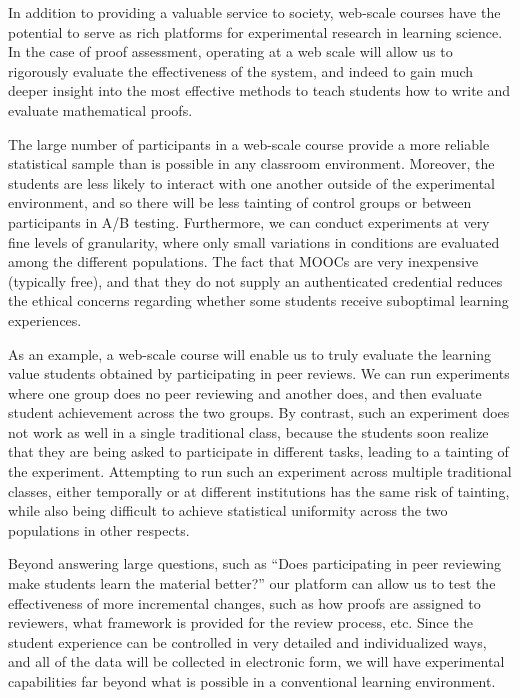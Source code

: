 \documentclass[12pt]{article}
\begin{document}
In addition to providing a valuable service to society, web-scale
courses have the potential to serve as rich platforms for experimental
research in learning science.  In the case of proof assessment,
operating at a web scale will allow us to rigorously evaluate the
effectiveness of the system, and indeed to gain much deeper insight
into the most effective methods to teach students how to write and
evaluate mathematical proofs.

The large number of participants in a web-scale course provide a more
reliable statistical sample than is possible in any classroom
environment.  Moreover, the students are less likely to interact with
one another outside of the experimental environment, and so there will
be less tainting of control groups or between participants in A/B
testing.  Furthermore, we can conduct experiments at very fine levels
of granularity, where only small variations in conditions are
evaluated among the different populations.  The fact that MOOCs are
very inexpensive (typically free), and that they do not supply an
authenticated credential reduces the ethical concerns regarding whether
some students receive suboptimal learning experiences.

As an example, a web-scale course will enable us to truly evaluate the
learning value students obtained by participating in peer reviews.  We
can run experiments where one group does no peer reviewing and another
does, and then evaluate student achievement across the two groups.  By
contrast, such an experiment does not work as well in a single
traditional class, because the students soon realize that they
are being asked to participate in different tasks, leading to a
tainting of the experiment.  Attempting to run such an experiment
across multiple traditional classes, either temporally or at different
institutions has the same risk of tainting, while also being difficult
to achieve statistical uniformity across the two populations in other
respects.

Beyond answering large questions, such as ``Does participating in peer
reviewing make students learn the material better?'' our platform can
allow us to test the effectiveness of more incremental changes, such
as how proofs are assigned to reviewers, what framework is provided
for the review process, etc.  Since the student experience can be
controlled in very detailed and individualized ways, and all of the
data will be collected in electronic form, we will have experimental
capabilities far beyond what is possible in a conventional learning
environment.
\end{document}

